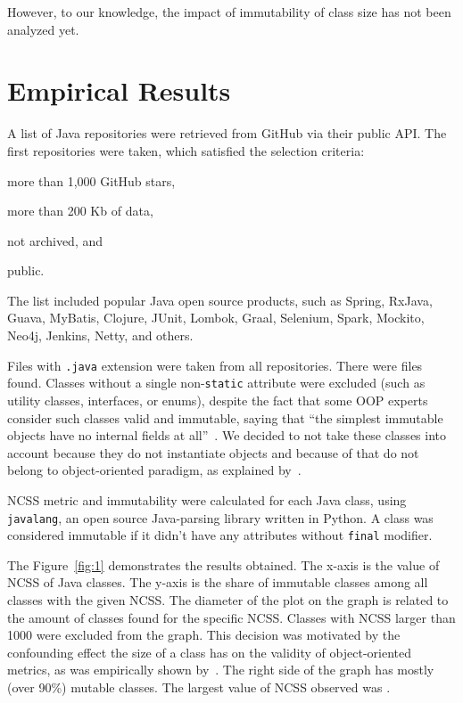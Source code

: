 \documentclass[12pt]{article}
\begin{document}
However, to our knowledge, the impact of immutability of class size has not been
analyzed yet.

\section{Empirical Results}

A list of Java repositories were retrieved from GitHub via their
public API. The first \thetotalrepos{} repositories were taken, which satisfied
the selection criteria:
\begin{enumerate*}[label={\arabic*)}]
\item more than 1,000 GitHub stars,
\item more than 200 Kb of data,
\item not archived, and
\item public.
\end{enumerate*}
The list included popular Java open source products, such as
Spring, RxJava, Guava, MyBatis, Clojure, JUnit, Lombok,
Graal, Selenium, Spark, Mockito, Neo4j, Jenkins, Netty, and others.

Files with \texttt{.java} extension were taken from all repositories.
There were \thetotaljavafiles{} files found. Classes without a single
non-\texttt{static} attribute were excluded (such as utility classes,
interfaces, or enums), despite the fact that some OOP
experts consider such classes valid and immutable, saying that
``the simplest immutable objects have no internal fields at all''~\citep{lea2000}.
We decided to not take these classes into account because they do not instantiate objects
and because of that do not belong to object-oriented paradigm,
as explained by~\cite{west2004,bugayenko2017}.

NCSS metric and immutability were calculated for each Java class,
using \texttt{javalang}, an open source Java-parsing library written in Python.
A class was considered immutable if it didn't have any
attributes without \texttt{final} modifier.

The Figure~\ref{fig:1} demonstrates the results obtained. The x-axis is
the value of NCSS of Java classes. The y-axis is the share of immutable classes among
all classes with the given NCSS. The diameter of the plot on the graph
is related to the amount of classes found for the specific NCSS. Classes
with NCSS larger than 1000 were excluded from the graph. This decision was
motivated by the confounding effect the size of a class has
on the validity of object-oriented metrics, as was empirically shown by~\citet{el2001}.
The right side of the graph has mostly (over 90\%) mutable classes. The largest
value of NCSS observed was \thelargestncss{}.
\end{document}
